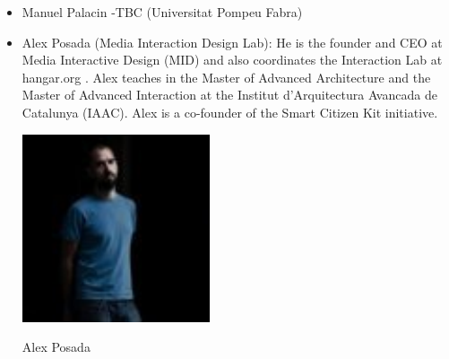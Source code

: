 \documentclass{tufte-book} %
\begin{document}
\begin{itemize}
\begin{itemize}
\begin{marginfigure}
\caption{Vanessa Gennarelli}
\end{marginfigure}
\item Manuel Palacin -TBC (Universitat Pompeu Fabra)
\item Alex Posada (Media Interaction Design Lab): He is the founder and CEO at Media Interactive Design (MID) and also coordinates the Interaction Lab at hangar.org . Alex teaches in the Master of Advanced Architecture and the Master of Advanced Interaction at the Institut d'Arquitectura Avancada de Catalunya (IAAC). Alex is a co-founder of the Smart Citizen Kit initiative.
\begin{marginfigure}
\includegraphics[width=0.5\linewidth]{alex}
\caption{Alex Posada}
\end{marginfigure}
\end{itemize}
\end{itemize}



\backmatter




\printindex %
\end{document}
